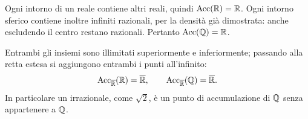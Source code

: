 \begin{esempio}
Ogni intorno di un reale contiene altri reali, quindi $\operatorname{Acc}(\mathbb{R})=\mathbb{R}$. Ogni intorno sferico contiene inoltre infiniti razionali, per la densità già dimostrata: anche escludendo il centro restano razionali. Pertanto $\operatorname{Acc}(\mathbb{Q})=\mathbb{R}$.

Entrambi gli insiemi sono illimitati superiormente e inferiormente; passando alla retta estesa si aggiungono entrambi i punti all'infinito:
\[
\operatorname{Acc}_{\overline{\mathbb{R}}}(\mathbb{R})=\overline{\mathbb{R}},
\qquad
\operatorname{Acc}_{\overline{\mathbb{R}}}(\mathbb{Q})=\overline{\mathbb{R}}.
\]
In particolare un irrazionale, come $\sqrt2$, è un punto di accumulazione di $\mathbb{Q}$ senza appartenere a $\mathbb{Q}$.
\end{esempio}
